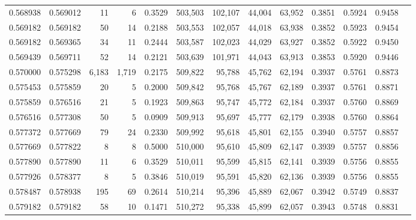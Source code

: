 \begin{tabular}{rrrrrrrrrrrrr}
0.568938 & 0.569012 &     11 &     6 &                                     0.3529 & 503,503 & 102,107 &  44,004 &  63,952 & 0.3851 & 0.5924 & 0.9458 \\
0.569182 & 0.569182 &     50 &    14 &                                     0.2188 & 503,553 & 102,057 &  44,018 &  63,938 & 0.3852 & 0.5923 & 0.9454 \\
0.569182 & 0.569365 &     34 &    11 &                                     0.2444 & 503,587 & 102,023 &  44,029 &  63,927 & 0.3852 & 0.5922 & 0.9450 \\
0.569439 & 0.569711 &     52 &    14 &                                     0.2121 & 503,639 & 101,971 &  44,043 &  63,913 & 0.3853 & 0.5920 & 0.9446 \\
0.570000 & 0.575298 &  6,183 & 1,719 &                                     0.2175 & 509,822 &  95,788 &  45,762 &  62,194 & 0.3937 & 0.5761 & 0.8873 \\
0.575453 & 0.575859 &     20 &     5 &                                     0.2000 & 509,842 &  95,768 &  45,767 &  62,189 & 0.3937 & 0.5761 & 0.8871 \\
0.575859 & 0.576516 &     21 &     5 &                                     0.1923 & 509,863 &  95,747 &  45,772 &  62,184 & 0.3937 & 0.5760 & 0.8869 \\
0.576516 & 0.577308 &     50 &     5 &                                     0.0909 & 509,913 &  95,697 &  45,777 &  62,179 & 0.3938 & 0.5760 & 0.8864 \\
0.577372 & 0.577669 &     79 &    24 &                                     0.2330 & 509,992 &  95,618 &  45,801 &  62,155 & 0.3940 & 0.5757 & 0.8857 \\
0.577669 & 0.577822 &      8 &     8 &                                     0.5000 & 510,000 &  95,610 &  45,809 &  62,147 & 0.3939 & 0.5757 & 0.8856 \\
0.577890 & 0.577890 &     11 &     6 &                                     0.3529 & 510,011 &  95,599 &  45,815 &  62,141 & 0.3939 & 0.5756 & 0.8855 \\
0.577926 & 0.578377 &      8 &     5 &                                     0.3846 & 510,019 &  95,591 &  45,820 &  62,136 & 0.3939 & 0.5756 & 0.8855 \\
0.578487 & 0.578938 &    195 &    69 &                                     0.2614 & 510,214 &  95,396 &  45,889 &  62,067 & 0.3942 & 0.5749 & 0.8837 \\
0.579182 & 0.579182 &     58 &    10 &                                     0.1471 & 510,272 &  95,338 &  45,899 &  62,057 & 0.3943 & 0.5748 & 0.8831 \\

\end{tabular}

